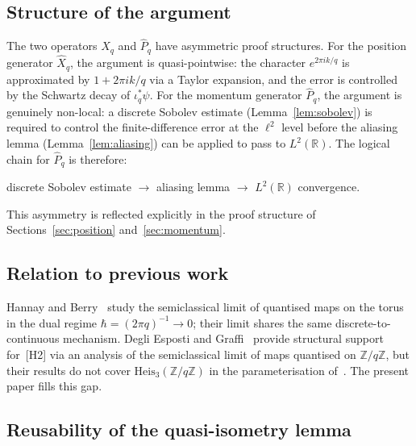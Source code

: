 \documentclass[12pt,a4paper]{article}
\newcommand{\Heis}{\mathrm{Heis}_3}
\newcommand{\Zq}{\mathbb{Z}/q\mathbb{Z}}
\newcommand{\ltwo}{L^2(\mathbb{R})}
\newcommand{\iotastar}{\iota_q^*}
\newcommand{\Xhat}{\hat{X}_q}
\newcommand{\Phat}{\hat{P}_q}
\begin{document}
    \subsection{Structure of the argument}

      The two operators $\Xhat$ and $\Phat$ have asymmetric proof structures.
      For the position generator $\Xhat$, the argument is quasi-pointwise:
      the character $e^{2\pi i k/q}$ is approximated by $1 + 2\pi ik/q$ via a Taylor expansion,
      and the error is controlled by the Schwartz decay of $\iotastar\psi$.
      For the momentum generator $\Phat$, the argument is genuinely non-local:
      a discrete Sobolev estimate (Lemma~\ref{lem:sobolev}) is required
      to control the finite-difference error at the $\ell^2$ level before the aliasing
      lemma (Lemma~\ref{lem:aliasing}) can be applied to pass to $\ltwo$.
      The logical chain for $\Phat$ is therefore:
      \begin{center}
        discrete Sobolev estimate $\longrightarrow$ aliasing lemma $\longrightarrow$ $\ltwo$ convergence.
      \end{center}
      This asymmetry is reflected explicitly in the proof structure of
      Sections~\ref{sec:position} and~\ref{sec:momentum}.

    \subsection{Relation to previous work}

      Hannay and Berry~\cite{HannayBerry1980} study the semiclassical limit of quantised maps
      on the torus in the dual regime $\hbar = (2\pi q)^{-1} \to 0$; their limit shares the same
      discrete-to-continuous mechanism.
      Degli Esposti and Graffi~\cite{DegliEspostiGraffi1993} provide structural support for~[H2]
      via an analysis of the semiclassical limit of maps quantised on $\mathbb{Z}/q\mathbb{Z}$,
      but their results do not cover $\Heis(\Zq)$ in the parameterisation of~\cite{Beau2026m}.
      The present paper fills this gap.

    \subsection{Reusability of the quasi-isometry lemma}
\end{document}
